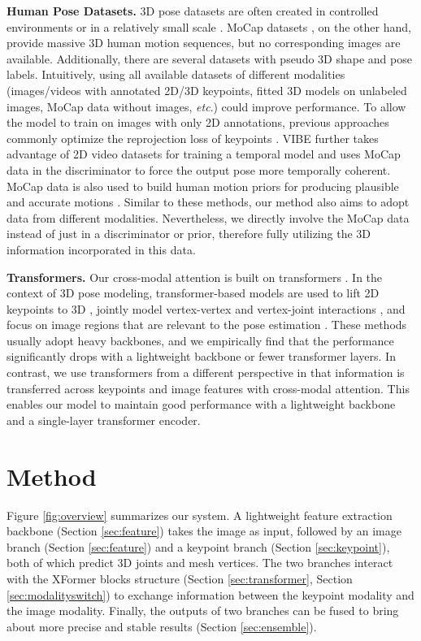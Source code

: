 \documentclass{article}
\newcommand\mypara[1]{\noindent\textbf{#1}}
\newcommand{\etc}{\textit{etc}.}
\begin{document}
\mypara{Human Pose Datasets.}
\label{sec:humanpose_datasets}
3D pose datasets are often created in controlled environments \cite{ionescu2013human3} or in a relatively small scale \cite{mehta2017monocular,von2018recovering}. MoCap datasets \cite{mahmood2019amass,mixamo}, on the other hand, provide massive 3D human motion sequences, but no corresponding images are available. Additionally, there are several datasets with pseudo 3D shape and pose labels. 
Intuitively, using all available datasets of different modalities (images/videos with annotated 2D/3D keypoints, fitted 3D models on unlabeled images, MoCap data without images, \etc) could improve performance. To allow the model to train on images with only 2D annotations, previous approaches commonly optimize the reprojection loss of keypoints \cite{kolotouros2019learning,mehta2020xnect}. 
VIBE further takes advantage of 2D video datasets for training a temporal model and uses MoCap data in the discriminator to force the output pose more temporally coherent. MoCap data is also used to build human motion priors for producing plausible and accurate motions \cite{rempe2021humor,kolotouros2021probabilistic}.
Similar to these methods, our method also aims to adopt data from different modalities. Nevertheless, we directly involve the MoCap data instead of just in a discriminator or prior, therefore fully utilizing the 3D information incorporated in this data.

\mypara{Transformers.}
Our cross-modal attention is built on transformers \cite{vaswani2017attention}. 
In the context of 3D pose modeling, transformer-based models are used to lift 2D keypoints to 3D \cite{li2021lifting,zhao2021graformer,li2022mhformer,shan2022p}, jointly model vertex-vertex and vertex-joint interactions \cite{lin2020end,lin2021-mesh-graphormer}, and focus on image regions that are relevant to the pose estimation \cite{zanfir2021thundr}. 
These methods usually adopt heavy backbones, and we empirically find that the performance significantly drops with a lightweight backbone or fewer transformer layers. 
In contrast, we use transformers from a different perspective in that information is transferred across keypoints and image features with cross-modal attention. This enables our model to maintain good performance with a lightweight backbone and a single-layer transformer encoder.

\section{Method}
Figure \ref{fig:overview} summarizes our system. A lightweight feature extraction backbone (Section \ref{sec:feature}) takes the image as input, followed by an image branch (Section \ref{sec:feature}) and a keypoint branch (Section \ref{sec:keypoint}), both of which predict 3D joints and mesh vertices. 
The two branches interact with the XFormer blocks structure (Section \ref{sec:transformer}, Section \ref{sec:modalityswitch}) to exchange information between the keypoint modality and the image modality.
Finally, the outputs of two branches can be fused to bring about more precise and stable results (Section \ref{sec:ensemble}).
\end{document}
